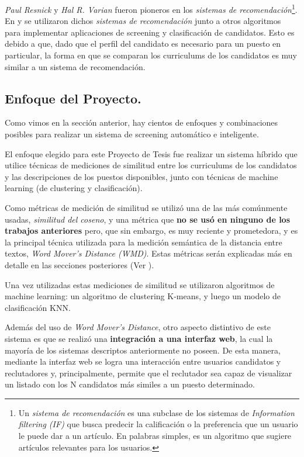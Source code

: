 \documentclass[12pt,a4paper]{article}
\begin{document}
\begin{sloppypar}
\textit{Paul Resnick} y \textit{Hal R. Varian} fueron pioneros en los \textit{sistemas de recomendación}\footnote{Un \textit{sistema de recomendación} es una subclase de los sistemas de \textit{Information filtering (IF)} que busca predecir la calificación o la preferencia que un usuario le puede dar a un artículo. En palabras simples, es un algoritmo que sugiere artículos relevantes para los usuarios.}\cite{sistema_recomendacion}.
En \cite{trabajos_relacionados_14} y \cite{trabajos_relacionados_15} se utilizaron dichos \textit{sistemas de recomendación} junto a otros algoritmos para implementar aplicaciones de screening y clasificación de candidatos. Esto es debido a que, dado que el perfil del candidato es necesario para un puesto en particular, la forma en que se comparan los curriculums de los candidatos es muy similar a un sistema de recomendación. 

\cleardoublepage    %

\subsection{Enfoque del Proyecto.}

Como vimos en la sección anterior, hay cientos de enfoques y combinaciones posibles para realizar un sistema de screening automático e inteligente.

El enfoque elegido para este Proyecto de Tesis fue realizar un sistema híbrido que utilice técnicas de mediciones de similitud entre los curriculums de los candidatos y las descripciones de los puestos disponibles, junto con técnicas de machine learning (de clustering y clasificación). 

Como métricas de medición de similitud se utilizó una de las más comúnmente usadas, \textit{similitud del coseno}, y una métrica que \textbf{no se usó en ninguno de los trabajos anteriores} pero, que sin embargo, es muy reciente y prometedora, y es la principal técnica utilizada para la medición semántica de la distancia entre textos, \textit{Word Mover's Distance (WMD)}. Estas métricas serán explicadas más en detalle en las secciones posteriores (Ver \textit{}).

Una vez utilizadas estas mediciones de similitud se utilizaron algoritmos de machine learning: un algoritmo de clustering K-means, y luego un modelo de clasificación KNN. 

Además del uso de \textit{Word Mover's Distance}, otro aspecto distintivo de este sistema es que se realizó una \textbf{integración a una interfaz web}, la cual la mayoría de los sistemas descriptos anteriormente no poseen. De esta manera, mediante la interfaz web se logra una interacción entre usuarios candidatos y reclutadores y, principalmente, permite que el reclutador sea capaz de visualizar un listado con los N candidatos más similes a un puesto determinado.


\end{sloppypar}
\end{document}
